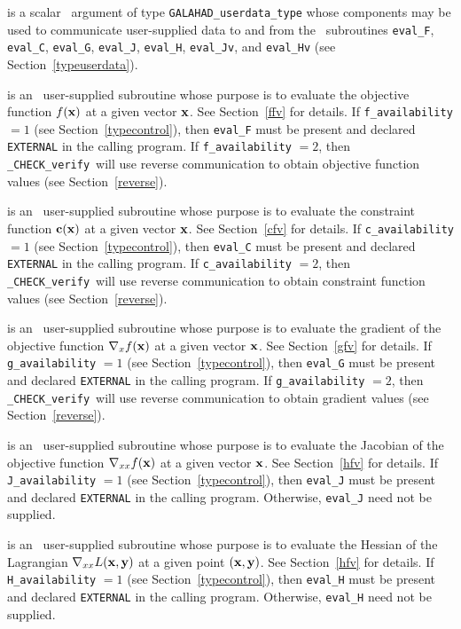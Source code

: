 \documentclass{galahad}
\newcommand{\packagename}{CHECK}
\newcommand{\fullpackagename}{\libraryname\_\packagename}
\newcommand{\solver}{{\tt \fullpackagename\_verify}}
\begin{document}
\begin{description}
 is a scalar \intentinout\ argument of type 
{\tt GALAHAD\_userdata\_type} whose components may be used
to communicate user-supplied data to and from the
\optional\ subroutines
{\tt eval\_F}, {\tt eval\_C}, {\tt eval\_G}, {\tt eval\_J},
{\tt eval\_H}, {\tt eval\_Jv}, and {\tt eval\_Hv}
(see Section~\ref{typeuserdata}). 

 is an \optional\ 
user-supplied subroutine whose purpose is to evaluate the 
objective function $f({\mathbf{x}})$ at a given vector ${\mathbf{x}}$.
See Section~\ref{ffv} for details.
If {\tt f\_availability} $=1$ (see Section~\ref{typecontrol}), then {\tt eval\_F}
must be present and declared {\tt EXTERNAL} in the calling program.
If {\tt f\_availability} $=2$, then \solver\ will use reverse communication to
obtain objective function values (see Section~\ref{reverse}).

 is an \optional\ 
user-supplied subroutine whose purpose is to evaluate the 
constraint function ${\mathbf{c}}({\mathbf{x}})$ at a given vector ${\mathbf{x}}$.
See Section~\ref{cfv} for details.
If {\tt c\_availability} $=1$ (see Section~\ref{typecontrol}), then {\tt eval\_C} must be present 
and declared {\tt EXTERNAL} in the calling program.
If {\tt c\_availability} $=2$, then \solver\ will use reverse communication to
obtain constraint function values (see Section~\ref{reverse}).

 is an \optional\ 
user-supplied subroutine whose purpose is to evaluate the  
gradient of the objective function $\nabla_x f({\mathbf{x}})$ at a given vector ${\mathbf{x}}$.
See Section~\ref{gfv} for details.
If {\tt g\_availability} $=1$ (see Section~\ref{typecontrol}), then {\tt eval\_G} must be present 
and declared {\tt EXTERNAL} in the calling program.
If {\tt g\_availability} $=2$, then \solver\ will use reverse communication to
obtain gradient values (see Section~\ref{reverse}).

\itt{eval\_J} is an \optional\ 
user-supplied subroutine whose purpose is to evaluate the 
Jacobian of the objective function $\nabla_{xx} f({\mathbf{x}})$ at a given vector ${\mathbf{x}}$.
See Section~\ref{hfv} for details.
If {\tt J\_availability} $=1$ (see Section~\ref{typecontrol}), then {\tt eval\_J} must be present and  
declared {\tt EXTERNAL} in the calling program.  Otherwise, {\tt eval\_J} need not be supplied.

\itt{eval\_H} is an \optional\ 
user-supplied subroutine whose purpose is to evaluate the
Hessian of the Lagrangian $\nabla_{xx} L({\mathbf{x}},{\mathbf{y}})$ at a given point $({\mathbf{x}},{\mathbf{y}})$.
See Section~\ref{hfv} for details.
If {\tt H\_availability} $=1$ (see Section~\ref{typecontrol}), then
{\tt eval\_H} must be present and  
declared {\tt EXTERNAL} in the calling program.  Otherwise, {\tt eval\_H} need not be supplied.


\end{description}
\end{document}
